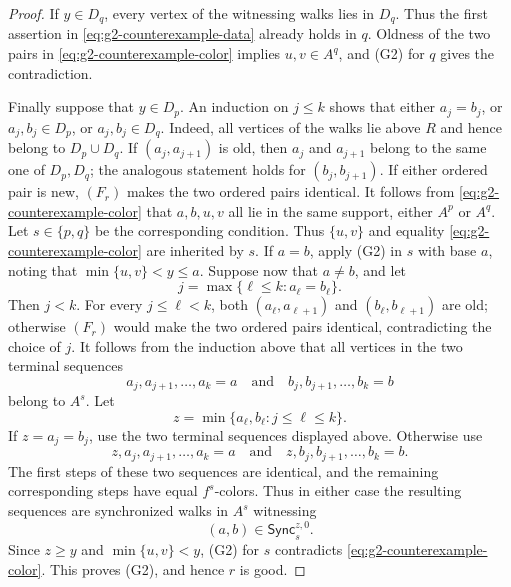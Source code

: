 \documentclass[10pt,a4paper]{amsart}
\numberwithin{equation}{section}
\theoremstyle{definition}
\theoremstyle{remark}
\begin{document}
\begin{proof}
If $y\in D_q$, every vertex of the witnessing walks lies in $D_q$.
Thus the first assertion in \eqref{eq:g2-counterexample-data} already
holds in $q$.  Oldness of the two pairs in
\eqref{eq:g2-counterexample-color} implies $u,v\in A^q$, and (G2) for
$q$ gives the
contradiction.

Finally suppose that $y\in D_p$.  An induction on $j\leq k$ shows that
either $a_j=b_j$, or $a_j,b_j\in D_p$, or $a_j,b_j\in D_q$.  Indeed,
all vertices of the walks lie above $R$ and hence belong to
$D_p\cup D_q$.  If $(a_j,a_{j+1})$ is old, then $a_j$ and $a_{j+1}$
belong to the same one of $D_p,D_q$; the analogous statement holds for
$(b_j,b_{j+1})$.  If either ordered pair is new, $(F_r)$ makes the two
ordered pairs identical.  It follows from
\eqref{eq:g2-counterexample-color} that
$a,b,u,v$ all lie in the same
support, either $A^p$ or $A^q$.  Let $s\in\{p,q\}$ be the corresponding
condition.  Thus $\{u,v\}$ and equality
\eqref{eq:g2-counterexample-color} are inherited by $s$.
If $a=b$, apply (G2) in $s$
with base $a$, noting that $\min\{u,v\}<y\leq a$.  Suppose now that
$a\ne b$, and let
\begin{displaymath}
 j=\max\{\ell\leq k:a_\ell=b_\ell\}.
\end{displaymath}
Then $j<k$.  For every $j\leq\ell<k$, both
$(a_\ell,a_{\ell+1})$ and $(b_\ell,b_{\ell+1})$ are old; otherwise
$(F_r)$ would make the two ordered pairs identical, contradicting the
choice of $j$.  It follows from the induction above that all vertices
in the two terminal sequences
\begin{displaymath}
 a_j,a_{j+1},\ldots,a_k=a
 \quad\text{and}\quad
 b_j,b_{j+1},\ldots,b_k=b
\end{displaymath}
belong to $A^s$.  Let
\begin{displaymath}
 z=\min\{a_\ell,b_\ell:j\leq\ell\leq k\}.
\end{displaymath}
If $z=a_j=b_j$, use the two terminal sequences displayed above.
Otherwise use
\begin{displaymath}
 z,a_j,a_{j+1},\ldots,a_k=a
 \quad\text{and}\quad
 z,b_j,b_{j+1},\ldots,b_k=b.
\end{displaymath}
The first steps of these two sequences are identical, and the remaining
corresponding steps have equal $f^s$-colors.  Thus in either case the
resulting sequences are synchronized walks in $A^s$ witnessing
\begin{displaymath}
 (a,b)\in\mathsf{Sync}^{z,0}_s.
\end{displaymath}
Since $z\geq y$ and $\min\{u,v\}<y$, (G2) for $s$ contradicts
\eqref{eq:g2-counterexample-color}.  This proves (G2), and hence $r$
is good.
\end{proof}
\end{document}
